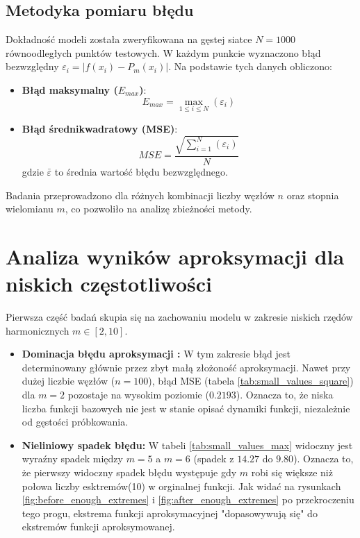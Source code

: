 \documentclass[twoside]{article}
\begin{document}
\subsection{Metodyka pomiaru błędu}
Dokładność modeli została zweryfikowana na gęstej siatce $N = 1000$ równoodległych punktów testowych. W każdym punkcie wyznaczono błąd bezwzględny $\varepsilon_i = |f(x_i) - P_m(x_i)|$. Na podstawie tych danych obliczono:

\begin{itemize}
    \item \textbf{Błąd maksymalny ($E_{max}$)}:
    \begin{equation}
    E_{max} = \max_{1 \le i \le N} (\varepsilon_i)
    \end{equation}
    
    \item \textbf{Błąd średnikwadratowy (MSE)}:
    \begin{equation}
    MSE = \frac{\sqrt{\sum_{i=1}^{N}(\varepsilon_{i})}}{N}
    \end{equation}
    gdzie $\bar{\varepsilon}$ to średnia wartość błędu bezwzględnego.
\end{itemize}

Badania przeprowadzono dla różnych kombinacji liczby węzłów $n$ oraz stopnia wielomianu $m$, 
co pozwoliło na analizę zbieżności metody.




\section*{Analiza wyników aproksymacji dla niskich częstotliwości}


Pierwsza część badań skupia się na zachowaniu modelu w zakresie niskich rzędów harmonicznych $m \in [2, 10]$.

\begin{itemize}
    \item \textbf{Dominacja błędu aproksymacji :} W tym zakresie błąd jest determinowany głównie przez zbyt małą złożoność aproksymacji.
    Nawet przy dużej liczbie węzłów ($n=100$), błąd MSE (tabela \ref{tab:small_values_square}) dla $m=2$ pozostaje na wysokim poziomie ($0.2193$).
    Oznacza to, że niska liczba funkcji bazowych nie jest w stanie opisać dynamiki funkcji, niezależnie od gęstości próbkowania.
    \item \textbf{Nieliniowy spadek błędu:} W tabeli \ref{tab:small_values_max} widoczny jest wyraźny spadek  między $m=5$ a $m=6$ 
    (spadek z $14.27$ do $9.80$). Oznacza to, że pierwszy widoczny spadek błędu występuje gdy $m$ robi się większe niż połowa liczby esktremów(10) w orginalnej
    funkcji. Jak widać na rysunkach \ref{fig:before_enough_extremes} i \ref{fig:after_enough_extremes} po przekroczeniu tego progu, ekstrema funkcji
    aproksymacyjnej "dopasowywują się" do ekstremów funkcji aproksymowanej.
\end{itemize}  
\end{document}
